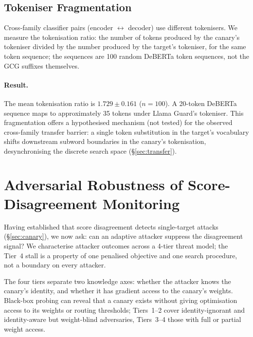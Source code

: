\documentclass{article}
\begin{document}
\subsection{Tokeniser Fragmentation}
\label{sec:tokeniser}

Cross-family classifier pairs (encoder $\leftrightarrow$ decoder) use different tokenisers. We measure the tokenisation ratio: the number of tokens produced by the canary's tokeniser divided by the number produced by the target's tokeniser, for the same token sequence; the sequences are 100 random DeBERTa token sequences, not the GCG suffixes themselves.

\paragraph{Result.} The mean tokenisation ratio is $1.729 \pm 0.161$ ($n = 100$). A 20-token DeBERTa sequence maps to approximately 35 tokens under Llama Guard's tokeniser. This fragmentation offers a hypothesised mechanism (not tested) for the observed cross-family transfer barrier: a single token substitution in the target's vocabulary shifts downstream subword boundaries in the canary's tokenisation, desynchronising the discrete search space (\S\ref{sec:transfer}).

\section{Adversarial Robustness of Score-Disagreement Monitoring}
\label{sec:adversarial-robustness}

Having established that score disagreement detects single-target attacks (\S\ref{sec:canary}), we now ask: can an adaptive attacker suppress the disagreement signal? We characterise attacker outcomes across a 4-tier threat model; the Tier~4 stall is a property of one penalised objective and one search procedure, not a boundary on every attacker.

The four tiers separate two knowledge axes: whether the attacker knows the canary's identity, and whether it has gradient access to the canary's weights. Black-box probing can reveal that a canary exists without giving optimisation access to its weights or routing thresholds; Tiers~1--2 cover identity-ignorant and identity-aware but weight-blind adversaries, Tiers~3--4 those with full or partial weight access.
\end{document}
